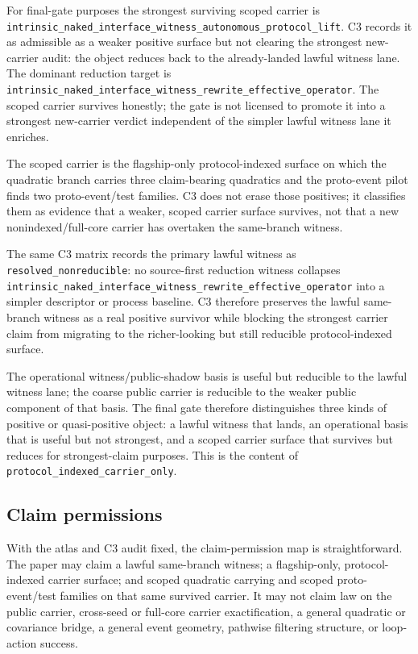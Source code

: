 \documentclass[11pt]{article}
\theoremstyle{definition}
\begin{document}
For final-gate purposes the strongest surviving scoped carrier is
\nolinkurl{intrinsic_naked_interface_witness_autonomous_protocol_lift}. C3 records it
as admissible as a weaker positive surface but not clearing the strongest new-carrier
audit: the object reduces back to the already-landed lawful witness lane. The dominant
reduction target is
\nolinkurl{intrinsic_naked_interface_witness_rewrite_effective_operator}. The scoped
carrier survives honestly; the gate is not licensed to promote it into a strongest
new-carrier verdict independent of the simpler lawful witness lane it enriches.

The scoped carrier is the flagship-only protocol-indexed surface on which the
quadratic branch carries three claim-bearing quadratics and the proto-event pilot
finds two proto-event/test families. C3 does not erase those positives; it classifies
them as evidence that a weaker, scoped carrier surface survives, not that a new
nonindexed/full-core carrier has overtaken the same-branch witness.

The same C3 matrix records the primary lawful witness as
\texttt{resolved\_nonreducible}: no source-first reduction witness collapses
\nolinkurl{intrinsic_naked_interface_witness_rewrite_effective_operator} into a
simpler descriptor or process baseline. C3 therefore preserves the lawful same-branch
witness as a real positive survivor while blocking the strongest carrier claim from
migrating to the richer-looking but still reducible protocol-indexed surface.

The operational witness/public-shadow basis is useful but reducible to the lawful
witness lane; the coarse public carrier is reducible to the weaker public component
of that basis. The final gate therefore distinguishes three kinds of positive or
quasi-positive object: a lawful witness that lands, an operational basis that is
useful but not strongest, and a scoped carrier surface that survives but reduces for
strongest-claim purposes. This is the content of
\texttt{protocol\_indexed\_carrier\_only}.

\subsection{Claim permissions}

With the atlas and C3 audit fixed, the claim-permission map is straightforward. The
paper may claim a lawful same-branch witness; a flagship-only, protocol-indexed
carrier surface; and scoped quadratic carrying and scoped proto-event/test families on
that same survived carrier. It may not claim law on the public carrier, cross-seed or
full-core carrier exactification, a general quadratic or covariance bridge, a general
event geometry, pathwise filtering structure, or loop-action success.
\end{document}
